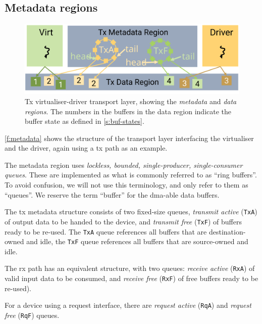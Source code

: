 \documentclass[a4paper,12pt]{report}
\newcommand{\code}[1]{\texttt{#1}}
\newcommand{\Obj}[1]{\textsl{#1}}
\newcommand{\figscale}{0.2}
\begin{document}
\subsection{Metadata regions}\label{s:ownership}\label{s:metadata}

\begin{figure}[th]
  \centering
  \includegraphics[scale=\figscale]{metadata}
  \caption[Tx virtualiser-driver transport layer, showing the
  \Obj{metadata} and \Obj{data regions}.]
  {Tx virtualiser-driver transport layer, showing the
    \Obj{metadata} and \Obj{data regions}. The numbers in the
    buffers in the data region indicate the buffer state as defined in
    \autoref{s:buf-states}.}
  \label{f:metadata}
\end{figure}

\autoref{f:metadata} shows the structure of the transport layer
interfacing the virtualiser and the driver, again using a \gls{tx} path as
an example.

The metadata region
uses \emph{lockless, bounded, single-producer, single-consumer queues}.
These are implemented as what is commonly referred to as ``ring
buffers''. To avoid confusion, we will not use this terminology, and
only refer to them as ``queues''. We reserve the term ``buffer'' for the
\gls{dma}-able data buffers.

The \gls{tx} metadata structure consists of two fixed-size queues, \emph{transmit
active} (\code{TxA}) of output data to be handed to the device,
and \emph{transmit free} (\code{TxF}) of buffers ready to be re-used. The \code{TxA} queue
references all buffers that are destination-owned and idle, the \code{TxF}
queue references all buffers that are source-owned and idle.

The \gls{rx} path has an equivalent structure, with two queues:
\emph{receive active} (\code{RxA}) of valid input data
to be consumed, and \emph{receive free}
(\code{RxF}) of free buffers ready to be re-used).

For a device using a request interface, there are
\emph{request active} (\code{RqA}) and \emph{request free}
(\code{RqF}) queues.
\end{document}
